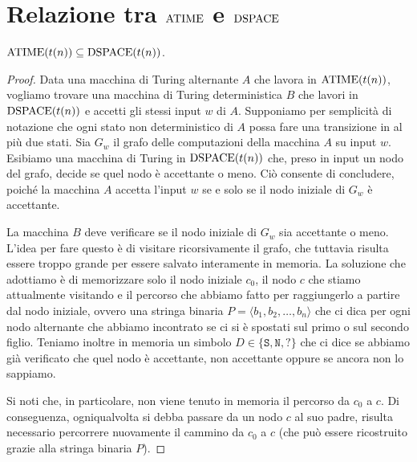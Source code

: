 \section{Relazione tra \texorpdfstring{$\operatorname{ATIME}$}{ATIME} e \texorpdfstring{$\operatorname{DSPACE}$}{DSPACE}}

\begin{teorema}
  \label{thm:atime-dspace}
  $\operatorname{ATIME}(t(n)) \subseteq \operatorname{DSPACE}(t(n))$.
\end{teorema}

\begin{proof}
 Data una macchina di Turing alternante $A$ che lavora in $\operatorname{ATIME}(t(n))$, vogliamo trovare
 una macchina di Turing deterministica $B$ che lavori in $\operatorname{DSPACE}(t(n))$ e accetti gli
 stessi input $w$ di $A$. Supponiamo per semplicità di notazione che ogni stato
 non deterministico di $A$ possa fare una transizione in al più due stati.
 Sia $G_w$ il grafo delle computazioni della macchina $A$ su input $w$.
 Esibiamo una macchina di Turing in $\operatorname{DSPACE}(t(n))$ che, preso in input un nodo
 del grafo, decide se quel nodo è accettante o meno. Ciò consente di concludere, poiché
 la macchina $A$ accetta l'input $w$ se e solo se il nodo iniziale
 di $G_w$ è accettante.
 
 La macchina $B$ deve verificare se il nodo iniziale di $G_w$ sia accettante o
 meno. L'idea per fare questo è di visitare ricorsivamente il grafo, che tuttavia
 risulta essere troppo grande per essere salvato interamente in memoria. La soluzione che adottiamo
 è di memorizzare solo il nodo iniziale $c_0$, il nodo $c$ che stiamo attualmente
 visitando e il percorso che abbiamo fatto per raggiungerlo a partire dal nodo
 iniziale, ovvero una stringa binaria $P = \langle b_1, b_2, \ldots, b_n \rangle$
 che ci dica per ogni nodo alternante
 che abbiamo incontrato se ci si è spostati sul primo o sul secondo figlio.
 Teniamo inoltre in memoria un simbolo $D \in \{\texttt{S}, \texttt{N}, \texttt{?}\}$ che ci dice se
 abbiamo già verificato che quel nodo è accettante, non accettante oppure
 se ancora non lo sappiamo.
 
 Si noti che, in particolare, non viene tenuto in memoria il percorso da $c_0$ a $c$.
 Di conseguenza, ogniqualvolta si debba passare da un nodo $c$ al suo padre,
 risulta necessario percorrere nuovamente il cammino da $c_0$ a $c$ (che può essere
 ricostruito grazie alla stringa binaria $P$).
 

\end{proof}
